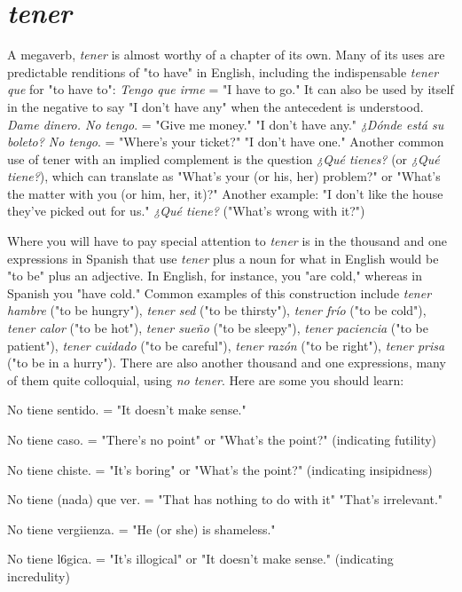 \documentclass[14pt,a4paper,oneside]{memoir}
\newcommand{\bsk}{\vspace{20pt}}
\newcommand{\indu}{\hspace{20pt}}
\begin{document}
\section{\emph{tener}}

A megaverb, \emph{tener} is almost worthy of a chapter of its own.
Many of its uses are predictable renditions of "to have" in English, including the indispensable \emph{tener que} for "to have to": \emph{Tengo que irme}
= "I have to go." It can also be used by itself in the negative to say "I
don't have any" when the antecedent is understood. \emph{Dame dinero. No
tengo}. = "Give me money." "I don't have any." \emph{¿Dónde está su boleto?
No tengo}. = "Where's your ticket?" "I don't have one." Another common use of tener with an implied complement is the question \emph{¿Qué
tienes?} (or \emph{¿Qué tiene?}), which can translate as "What's your (or his,
her) problem?" or "What's the matter with you (or him, her, it)?" Another example: "I don't like the house they've picked out for us." \emph{¿Qué
tiene?} ("What's wrong with it?")

Where you will have to pay special attention to \emph{tener} is in the
thousand and one expressions in Spanish that use \emph{tener} plus a noun for
what in English would be "to be" plus an adjective. In English, for instance, you "are cold," whereas in Spanish you "have cold." Common
examples of this construction include \emph{tener hambre} ("to be hungry"),
\emph{tener sed} ("to be thirsty"), \emph{tener frío} ("to be cold"), \emph{tener calor} ("to be
hot"), \emph{tener sueño} ("to be sleepy"), \emph{tener paciencia} ("to be patient"),
\emph{tener cuidado} ("to be careful"), \emph{tener razón} ("to be right"), \emph{tener prisa}
("to be in a hurry").
There are also another thousand and one expressions, many of
them quite colloquial, using \emph{no tener}. Here are some you should learn:

\bsk

\indu No tiene sentido. = "It doesn't make sense."

\indu No tiene caso. = "There's no point" or "What's the point?"
(indicating futility)

\indu No tiene chiste. = "It's boring" or "What's the point?" (indicating insipidness)

\indu No tiene (nada) que ver. = "That has nothing to do with it"
"That's irrelevant."

\indu No tiene vergiienza. = "He (or she) is shameless."

\indu No tiene l6gica. = "It's illogical" or "It doesn't make sense."
(indicating incredulity)
\end{document}
